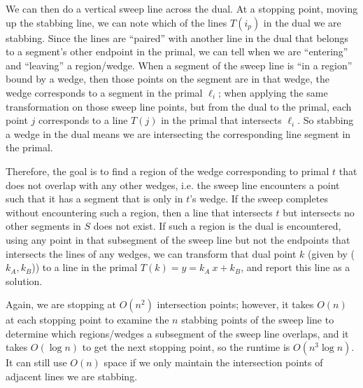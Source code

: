 \documentclass [12pt]{article}
\begin{document}
\begin{enumerate}[label=\alph*.]
        We can then do a vertical sweep line across the dual. At a stopping point, moving up the stabbing line, we can note which of the lines $T(i_p)$ in the dual we are stabbing. Since the lines are ``paired'' with another line in the dual that belongs to a segment's other endpoint in the primal, we can tell when we are ``entering'' and ``leaving'' a region/wedge. When a segment of the sweep line is ``in a region'' bound by a wedge, then those points on the segment are in that wedge, the wedge corresponds to a segment in the primal $\ell_i$; when applying the same transformation on those sweep line points, but from the dual to the primal, each point $j$ corresponds to a line $T(j)$ in the primal that intersects $\ell_i$. So stabbing a wedge in the dual means we are intersecting the corresponding line segment in the primal. 
        
        Therefore, the goal is to find a region of the wedge corresponding to primal $t$ that does not overlap with any other wedges, i.e. the sweep line encounters a point such that it has a segment that is only in $t$'s wedge. If the sweep completes without encountering such a region, then a line that intersects $t$ but intersects no other segments in $S$ does not exist. If such a region is the dual is encountered, using any point in that subsegment of the sweep line but not the endpoints that intersects the lines of any wedges, we can transform that dual point $k$ (given by ($k_A, k_B$)) to a line in the primal $T(k) = y = k_A\ x + k_B$, and report this line as a solution.

        Again, we are stopping at $O(n^2)$ intersection points; however, it takes $O(n)$ at each stopping point to examine the $n$ stabbing points of the sweep line to determine which regions/wedges a subsegment of the sweep line overlaps, and it takes $O(\log n)$ to get the next stopping point, so the runtime is $O(n^3 \log n)$. It can still use $O(n)$ space if we only maintain the intersection points of adjacent lines we are stabbing.
       
    \end{enumerate}


    \pagebreak



\end{document}
